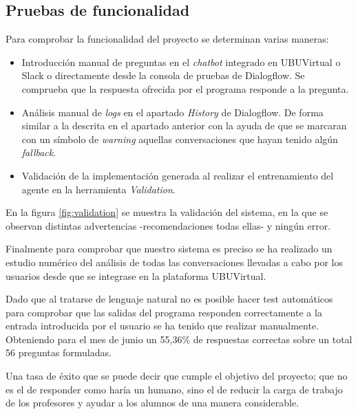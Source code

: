 \subsection{Pruebas de funcionalidad}

Para comprobar la funcionalidad del proyecto se determinan varias maneras:
\begin{itemize}
	\tightlist
	\item 
	Introducción manual de preguntas en el \textit{chatbot} integrado en UBUVirtual o Slack o directamente desde la consola de pruebas de Dialogflow. Se comprueba que la respuesta ofrecida por el programa responde a la pregunta.
	\item 
	Análisis manual de \textit{logs} en el apartado \textit{History} de Dialogflow. De forma similar a la descrita en el apartado anterior con la ayuda de que se marcaran con un símbolo de \textit{warning} aquellas conversaciones que hayan tenido algún \textit{fallback}.
	\item 
	Validación de la implementación generada al realizar el entrenamiento del agente en la herramienta \textit{Validation}.
\end{itemize}

En la figura \ref{fig:validation} se muestra la validación del sistema, en la que se observan distintas advertencias -recomendaciones todas ellas- y ningún error.

Finalmente para comprobar que nuestro sistema es preciso se ha realizado un estudio numérico del análisis de todas las conversaciones llevadas a cabo por los usuarios desde que se integrase en la plataforma UBUVirtual.  

Dado que al tratarse de lenguaje natural no es posible hacer test automáticos para comprobar que las salidas del programa responden correctamente a la entrada introducida por el usuario se ha tenido que realizar manualmente. Obteniendo para el mes de junio un 55,36\% de respuestas correctas sobre un total 56 preguntas formuladas.

Una tasa de éxito que se puede decir que cumple el objetivo del proyecto; que no es el de responder como haría un humano, sino el de reducir la carga de trabajo de los profesores y ayudar a los alumnos de una manera considerable.